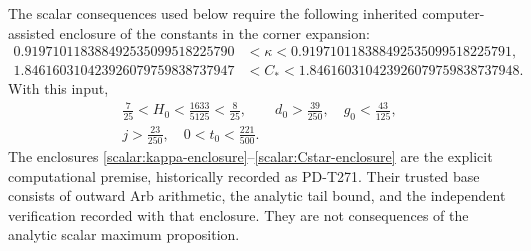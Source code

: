\begin{proposition}
\label{scalar:origin-bounds}
The scalar consequences used below require the following inherited
computer-assisted enclosure of the constants in the corner expansion:
\begin{align}
 0.919710118388492535099518225790
 &<\kappa<0.919710118388492535099518225791,
                                                     \label{scalar:kappa-enclosure}\\
 1.846160310423926079759838737947
 &<C_*<1.846160310423926079759838737948.
                                                     \label{scalar:Cstar-enclosure}
\end{align}
With this input,
\begin{equation}\label{scalar:rational-bounds}
 \begin{gathered}
 \frac7{25}<H_0<\frac{1633}{5125}<\frac8{25},\qquad
 d_0>\frac{39}{250},\quad g_0<\frac{43}{125},\\
 j>\frac{23}{250},\quad 0<t_0<\frac{221}{500}.
 \end{gathered}
\end{equation}
The enclosures \eqref{scalar:kappa-enclosure}--\eqref{scalar:Cstar-enclosure}
are the explicit computational premise, historically recorded as
PD-T271.  Their trusted base consists of outward Arb arithmetic, the
analytic tail bound, and the independent verification recorded with
that enclosure.  They are not consequences of the analytic scalar
maximum proposition.
\end{proposition}

